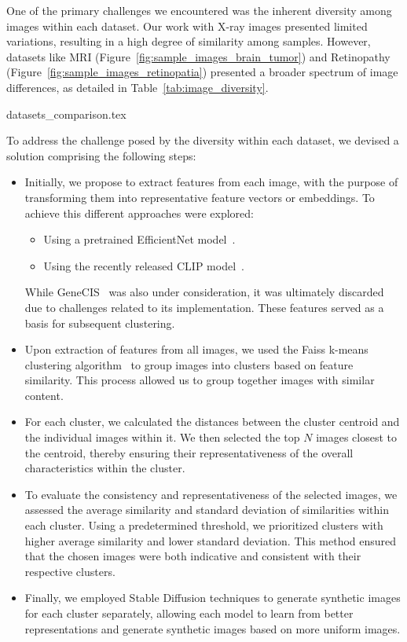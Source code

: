 One of the primary challenges we encountered was the inherent diversity among images within each dataset. Our work with X-ray images presented limited variations, resulting in a high degree of similarity among samples. However, datasets like MRI (Figure~\ref{fig:sample_images_brain_tumor}) and Retinopathy (Figure~\ref{fig:sample_images_retinopatia}) presented a broader spectrum of image differences, as detailed in Table~\ref{tab:image_diversity}.

{datasets_comparison.tex}

To address the challenge posed by the diversity within each dataset, we devised a solution comprising the following steps:

\begin{itemize}
  \item Initially, we propose to extract features from each image, with the purpose of transforming them into representative feature vectors or embeddings. To achieve this different approaches were explored:
    \begin{itemize}
      \item Using a pretrained EfficientNet model~\cite{efficientnet}.
      \item Using the recently released CLIP model~\cite{clip}. 
    \end{itemize}

While GeneCIS~\cite{genecis} was also under consideration, it was ultimately discarded due to challenges related to its implementation. These features served as a basis for subsequent clustering.

  \item Upon extraction of features from all images, we used the Faiss k-means clustering algorithm~\cite{faiss} to group images into clusters based on feature similarity. This process allowed us to group together images with similar content.

  \item For each cluster, we calculated the distances between the cluster centroid and the individual images within it. We then selected the top $N$ images closest to the centroid, thereby ensuring their representativeness of the overall characteristics within the cluster.

  \item To evaluate the consistency and representativeness of the selected images, we assessed the average similarity and standard deviation of similarities within each cluster. Using a predetermined threshold, we prioritized clusters with higher average similarity and lower standard deviation. This method ensured that the chosen images were both indicative and consistent with their respective clusters.

  \item Finally, we employed Stable Diffusion techniques to generate synthetic images for each cluster separately, allowing each model to learn from better representations and generate synthetic images based on more uniform images.
\end{itemize}

